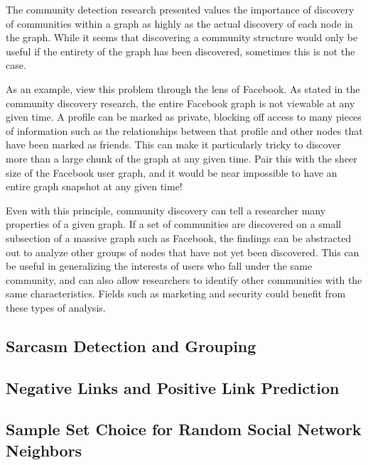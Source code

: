 \documentclass{sig-alternate}
\begin{document}
The community detection research presented values the importance of discovery of communities within a graph as highly
as the actual discovery of each node in the graph. While it seems that discovering a community structure would only be
useful if the entirety of the graph has been discovered, sometimes this is not the case. 

As an example, view this problem through the lens of Facebook. As stated in the community discovery research, the entire Facebook
graph is not viewable at any given time. A profile can be marked as private, blocking off access to many pieces of 
information such as the relationships between that profile and other nodes that have been marked as friends. This 
can make it particularly tricky to discover more than a large chunk of the graph at any given time. Pair this with the sheer
size of the Facebook user graph, and it would be near impossible to have an entire graph snapshot at any given time!

Even with this principle, community discovery can tell a researcher many properties of a given graph. If a set of communities are discovered on a small subsection of a massive graph such as Facebook, the findings can be abstracted out to analyze other groups of
nodes that have not yet been discovered. This can be useful in generalizing the interests of users who fall under the same
community, and can also allow researchers to identify other communities with the same characteristics. Fields such as marketing 
and security could benefit from these types of analysis.

\subsection{Sarcasm Detection and Grouping}
\label{sarcasm detection and grouping}

\subsection{Negative Links and Positive Link Prediction}
\label{negative links and positive link prediction}

\subsection{Sample Set Choice for Random Social Network Neighbors}
\label{sample set choice for random social network neighbors}
\end{document}
